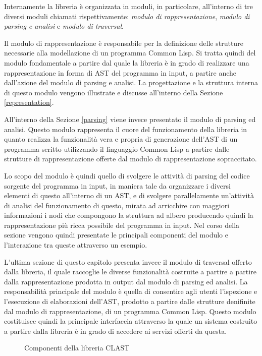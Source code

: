 \documentclass{book}
\newcommand{\image}[4]{
  \begin{figure}[H]
  \makebox[\textwidth][c]{
    \texttt{[image: \#1]}
  }
  \caption{#2}
  \label{#3}
  \end{figure}
}
\begin{document}
Internamente la libreria è organizzata in moduli, in particolare, all'interno di
tre diversi moduli chiamati rispettivamente: \textit{modulo di
rappresentazione}, \textit{modulo di parsing e analisi} e \textit{modulo di
traversal}.

Il modulo di rappresentazione è responsabile per la definizione delle strutture
necessarie alla modellazione di un programma Common Lisp. Si tratta quindi del
modulo fondamentale a partire dal quale la libreria è in grado di realizzare una
rappresentazione in forma di AST del programma in input, a partire anche
dall'azione del modulo di parsing e analisi. La progettazione e la struttura
interna di questo modulo vengono illustrate e discusse all'interno della Sezione
\ref{representation}.

All'interno della Sezione \ref{parsing} viene invece presentato il modulo di
parsing ed analisi. Questo modulo rappresenta il cuore del funzionamento della
libreria in quanto realizza la funzionalità vera e propria di generazione
dell'AST di un programma scritto utilizzando il linguaggio Common Lisp a partire
dalle strutture di rappresentazione offerte dal modulo di rappresentazione
sopraccitato.

Lo scopo del modulo è quindi quello di svolgere le attività di parsing del
codice sorgente del programma in input, in maniera tale da organizzare i diversi
elementi di questo all'interno di un AST, e di svolgere parallelamente
un'attività di analisi del funzionamento di questo, mirata ad arricchire con
maggiori informazioni i nodi che compongono la struttura ad albero producendo
quindi la rappresentazione più ricca possibile del programma in input. Nel corso
della sezione vengono quindi presentate le principali componenti del modulo e
l'interazione tra queste attraverso un esempio.

L'ultima sezione di questo capitolo presenta invece il modulo di traversal
offerto dalla libreria, il quale raccoglie le diverse funzionalità costruite a
partire a partire dalla rappresentazione prodotta in output dal modulo di
parsing ed analisi. La responsabilità principale del modulo è quella di
consentire agli utenti l'ispezione e l'esecuzione di elaborazioni dell'AST,
prodotto a partire dalle strutture denifinite dal modulo di rappresentazione, di
un programma Common Lisp. Questo modulo costituisce quindi la principale
interfaccia attraverso la quale un sistema costruito a partire dalla libreria è
in grado di accedere ai servizi offerti da questa.

\image{img/clast-architecture.png}
      {Componenti della libreria CLAST}
      {fig:clast-architecture}
      {0.5}
\end{document}
